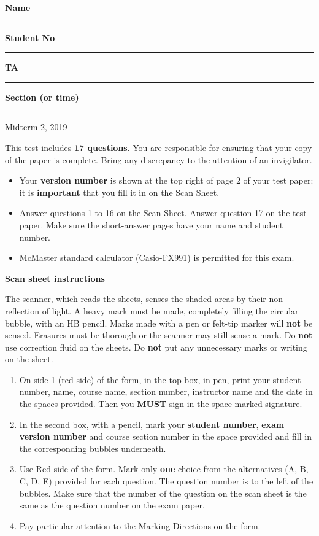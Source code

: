 \documentclass[12pt]{article}
\begin{document}
\noindent \textbf{Name} \rule{5cm}{1pt} \hfill \textbf{Student No} \rule{5cm}{1pt}

\noindent \textbf{TA} \rule{5cm}{1pt} \hfill \textbf{Section (or time)} \rule{5cm}{1pt}

\bigskip

{ \par}
{\centering Midterm 2, 2019 \par}

\parindent0pt

\vfill

This test includes {\bf 17 questions}. You are responsible for ensuring that your copy of the paper is complete. Bring any discrepancy to the attention of an invigilator. 

\vfill

\begin{itemize}
\item Your \textbf{version number} is shown at the top right of page 2 of your test paper: it is \textbf{important} that you fill it in on the Scan Sheet.
\item Answer questions 1 to 16 on the Scan Sheet. Answer question 17 on the test paper. Make sure the short-answer pages have your name and student number.
\item McMaster standard calculator (Casio-FX991) is permitted for this exam.
\end{itemize}

\vfill

\textbf{Scan sheet instructions}

\small{
The scanner, which reads the sheets, senses the shaded areas by their non-reflection of light. A heavy mark must be made, completely filling the circular bubble, with an HB pencil. Marks made with a pen or felt-tip marker will \textbf{not} be sensed. Erasures must be thorough or the scanner may still sense a mark. Do \textbf{not} use correction fluid on the sheets. Do \textbf{not} put any unnecessary marks or writing on the sheet.

\begin{enumerate}
\item On side 1 (red side) of the form, in the top box, in pen, print your student number, name, course name, section number, instructor name and the date in the spaces provided. Then you {\bf MUST} sign in the space marked signature.

\item In the second box, with a pencil, mark your {\bf student number}, {\bf exam version number} and course section number in the space provided and fill in the corresponding bubbles underneath.

\item Use Red side of the form. Mark only {\bf one} choice from the alternatives (A, B, C, D, E) provided for each question. The question number is to the left of the bubbles. Make sure that the number of the question on the scan sheet is the same as the question number on the exam paper.
\item  Pay particular attention to the Marking Directions on the form.
\end{enumerate}
}

\vfill
{ \par}
\end{document}
